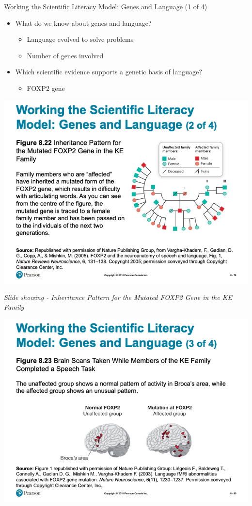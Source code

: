 \documentclass[
]{book}
\providecommand{\tightlist}{%
  \setlength{\itemsep}{0pt}\setlength{\parskip}{0pt}}
\begin{document}
Working the Scientific Literacy Model: Genes and Language (1 of 4)

\begin{itemize}
\tightlist
\item
  What do we know about genes and language?

  \begin{itemize}
  \tightlist
  \item
    Language evolved to solve problems\\
  \item
    Number of genes involved
  \end{itemize}
\item
  Which scientific evidence supports a genetic basis of language?

  \begin{itemize}
  \tightlist
  \item
    FOXP2 gene
  \end{itemize}
\end{itemize}

\includegraphics{assets/unit_1/slide_79.png}

\emph{Slide showing - Inheritance Pattern for the Mutated FOXP2 Gene in the KE Family}

\includegraphics{assets/unit_1/slide_80.png}
\end{document}
